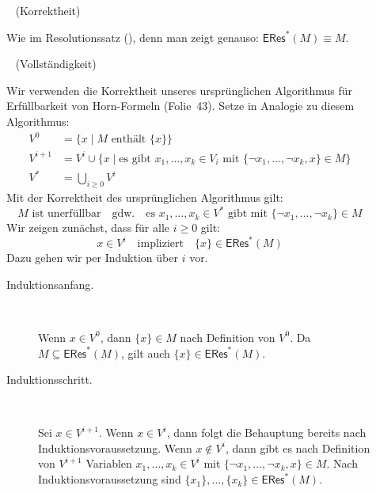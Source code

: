 \documentclass[fontsize=11pt, twoside=false, numbers=autoenddot]{scrbook}
\begin{document}
\par\noindent
\begin{beweis}
  \begin{description}
    \item[]~
      (Korrektheit)
      \par
      Wie im Resolutionssatz (\hyperlink{TBewResSatz}{\TBewResSatz}),
      denn man zeigt genauso: $\textsf{ERes}^*(M) \equiv M$.
    \item[]~
      (Vollständigkeit)
      \par
      Wir verwenden die Korrektheit unseres ursprünglichen Algorithmus
      für Erfüllbarkeit von Horn-Formeln (Folie~43).
      Setze in Analogie zu diesem Algorithmus:
      \begin{align*}
        V^0     & = \big\{x \mid M \text{~enthält~} \{x\}\big\} \\
        V^{i+1} & = V^i \cup \big\{x \mid \text{es gibt~} x_1,\dots,x_k \in V_i \text{~mit~} \{\lnot x_1,\dots,\lnot x_k,x\} \in M\big\} \\[2mm]
        V^*     & = \displaystyle\bigcup_{i \geq 0} V^i
      \end{align*}
      Mit der Korrektheit des ursprünglichen Algorithmus gilt:
      \[
        \tag{$*$}
        M \text{~ist unerfüllbar}
        \quad\text{gdw.}\quad
        \text{es $x_1,\dots,x_k \in V^*$ gibt mit~} \{\lnot x_1,\dots,\lnot x_k\} \in M
      \]
      Wir zeigen zunächst, dass für alle $i \geq 0$ gilt:
      \[
        \tag{$**$}
        x \in V^i
        \quad\text{impliziert}\quad
        \{x\} \in \textsf{ERes}^*(M)
      \]
      Dazu gehen wir per Induktion über $i$ vor.
      \begin{description}
        \item[Induktionsanfang.]
          ~\par
          Wenn $x \in V^0$, dann $\{x\} \in M$ nach Definition von $V^0$.
          Da $M \subseteq \textsf{ERes}^*(M)$,
          gilt auch $\{x\} \in \textsf{ERes}^*(M)$.
        \item[Induktionsschritt.]
          ~\par
          Sei $x \in V^{i+1}$.
          Wenn $x \in V^i$, dann folgt die Behauptung bereits nach Induktionsvoraussetzung.
          Wenn $x \notin V^i$, dann gibt es nach Definition von $V^{i+1}$
          Variablen $x_1,\dots,x_k \in V^i$ mit $\{\lnot x_1,\dots,\lnot x_k,x\} \in M$.
          Nach Induktionsvoraussetzung sind $\{x_1\},\dots,\{x_k\} \in \textsf{ERes}^*(M)$.

\end{description}
\end{description}
\end{beweis}
\end{document}
